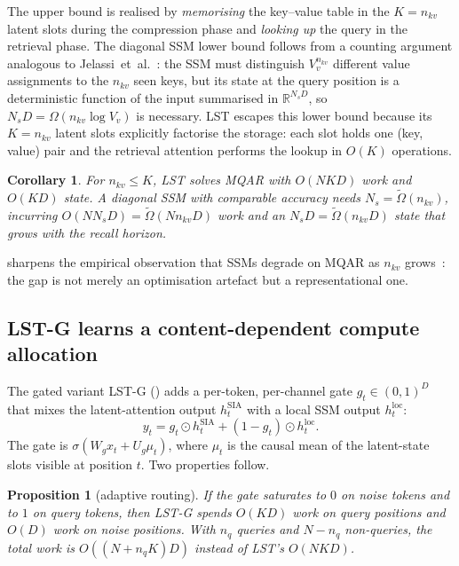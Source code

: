 \documentclass[10pt,twocolumn,letterpaper]{article}
\newcommand{\LST}{\textsc{LST}}
\newtheorem{corollary}[theorem]{Corollary}
\newtheorem{proposition}[theorem]{Proposition}
\begin{document}
The upper bound is realised by \emph{memorising} the key--value table in
the $K\!=\!n_{kv}$ latent slots during the compression phase and
\emph{looking up} the query in the retrieval phase.  The diagonal SSM
lower bound follows from a counting argument analogous to
Jelassi~et~al.~\cite{arora2024theoretical}: the SSM must distinguish
$V_v^{n_{kv}}$ different value assignments to the $n_{kv}$ seen keys, but
its state at the query position is a deterministic function of the input
summarised in $\mathbb{R}^{N_s D}$, so $N_s D\!=\!\Omega(n_{kv}\log V_v)$
is necessary.  \LST{} escapes this lower bound because its $K\!=\!n_{kv}$
latent slots explicitly factorise the storage: each slot holds one
(key, value) pair and the retrieval attention performs the lookup in
$O(K)$ operations.

\begin{corollary}
\label{cor:lst}
For $n_{kv}\!\leq\!K$, \LST{} solves MQAR with $O(NKD)$ work and
$O(KD)$ state.  A diagonal SSM with comparable accuracy needs
$N_s\!=\!\tilde\Omega(n_{kv})$, incurring $O(N N_s D)\!=\!\tilde\Omega(N n_{kv} D)$
work and an $N_s D\!=\!\tilde\Omega(n_{kv} D)$ state that grows with the
recall horizon.
\end{corollary}

 sharpens the empirical observation that SSMs degrade on
MQAR as $n_{kv}$ grows~\cite{arora2023simple,arora2024theoretical}: the
gap is not merely an optimisation artefact but a representational one.

\subsection{\LST-G{} learns a content-dependent compute allocation}
\label{sec:gated-theory}

The gated variant \LST-G{} () adds a per-token,
per-channel gate $g_t\in(0,1)^D$ that mixes the latent-attention output
$h^{\text{SIA}}_t$ with a local SSM output $h^{\text{loc}}_t$:
\begin{equation}
y_t = g_t \odot h^{\text{SIA}}_t + (1 - g_t) \odot h^{\text{loc}}_t .
\label{eq:gate}
\end{equation}
The gate is $\sigma(W_g x_t + U_g \mu_t)$, where $\mu_t$ is the causal mean
of the latent-state slots visible at position $t$.  Two properties follow.

\begin{proposition}[adaptive routing]
\label{prop:route}
If the gate saturates to $0$ on noise tokens and to $1$ on query tokens,
then \LST-G{} spends $O(KD)$ work on query positions and $O(D)$ work on
noise positions.  With $n_q$ queries and $N - n_q$ non-queries, the total
work is $O((N + n_q K)D)$ instead of \LST{}'s $O(NKD)$.
\end{proposition}
\end{document}
